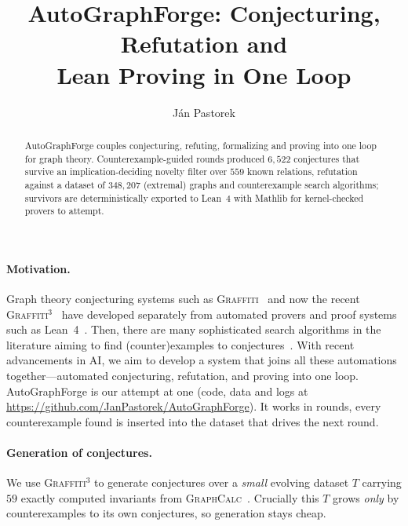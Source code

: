 \documentclass[runningheads]{llncs}
\begin{document}
\title{AutoGraphForge: Conjecturing, Refutation and\\
Lean Proving in One Loop}


\author{J\'an Pastorek}


\maketitle

\begin{abstract}
\textsf{AutoGraphForge} couples conjecturing, refuting, formalizing and proving
into one loop for graph theory. Counterexample-guided rounds produced $6{,}522$
conjectures that survive an implication-deciding novelty filter over $559$ known
relations, refutation against a dataset of $348{,}207$ (extremal) graphs and counterexample search algorithms; survivors are
deterministically exported to Lean~4 with Mathlib for kernel-checked provers to attempt.
\end{abstract}

\paragraph{Motivation.}
Graph theory conjecturing systems such as
\textsc{Graffiti}~\cite{fajtlowicz1988conjectures} and now the recent
\textsc{Graffiti}$^3$~\cite{davila2026graffiti3} have developed separately from automated provers and proof systems such as
Lean~4~\cite{moura2015lean}. Then, there are many sophisticated search algorithms in the literature aiming to find (counter)examples to conjectures~\cite{jooken2025computer}. With recent advancements in AI, we aim to develop a system that joins all these automations together---automated conjecturing, refutation, and proving into one loop. \textsf{AutoGraphForge} is our attempt at one (code, data and logs at
\url{https://github.com/JanPastorek/AutoGraphForge}). It works in rounds, every
counterexample found is inserted into the dataset that drives the next round.

\paragraph{Generation of conjectures.}
We use \textsc{Graffiti}$^3$ to generate conjectures over a \emph{small}
evolving dataset $T$
carrying $59$ exactly computed invariants from
\textsc{GraphCalc}~\cite{davila2025graphcalc}. Crucially this $T$ grows \emph{only}
by counterexamples to its own conjectures, so generation stays cheap.
\end{document}
